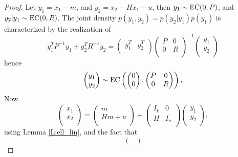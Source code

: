 \begin{proof}
Let $y_1=x_1-m$, and $y_2=x_2-Hx_1-u$, then $y_1\sim \operatorname*{EC}(0,P)$, and 
$y_2|y_1\sim \operatorname*{EC}(0,R)$.
The joint density $p(y_1,y_2)=p(y_2|y_1) p(y_1)$ is characterized by the
realization of
\[
  y_1^T P^{-1} y_1 + y_2^T R^{-1} y_2 =
  \begin{pmatrix}
    y_1^T & y_2^T \\
  \end{pmatrix}
  \begin{pmatrix}
    P & 0  \\
    0 & R  \\
  \end{pmatrix}^{-1}
  \begin{pmatrix}
    y_1 \\
	y_2 \\
  \end{pmatrix}
\]
hence 
\[
  \begin{pmatrix}
    y_1 \\
    y_2 \\
  \end{pmatrix}
  \sim
  \operatorname*{EC} 
    \left(
	  \begin{pmatrix}
        0 \\
        0 \\
      \end{pmatrix},
	  \begin{pmatrix}
        P   & 0 \\
        0   & R \\
      \end{pmatrix}
    \right),
\]
Now 
\[
  \begin{pmatrix}
    x_1 \\
    x_2 \\
  \end{pmatrix}
  =
  \begin{pmatrix}
    m    \\
    Hm+u \\
  \end{pmatrix}
  +
  \begin{pmatrix}
    I_k & 0   \\
    H   & I_n \\
  \end{pmatrix}
  \begin{pmatrix}
    y_1 \\
    y_2 \\
  \end{pmatrix},
\]
using Lemma \ref{L:ell_lin}, and the fact that
\[
  \begin{pmatrix}

\end{pmatrix}\]
\end{proof}
